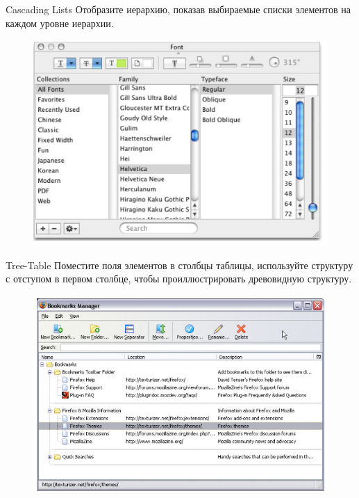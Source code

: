 \documentclass{beamer}
\begin{document}
\begin{frame}[t]{Cascading Lists}
	Отобразите иерархию, показав выбираемые списки элементов на каждом уровне иерархии.
	\begin{figure}[h]
		\centering
		\includegraphics[scale=0.5]{images/lec07-pic65.png}
	\end{figure}
\end{frame}	

\begin{frame}[t]{Tree-Table}
	Поместите поля элементов в столбцы таблицы, используйте структуру с отступом в первом столбце, чтобы проиллюстрировать древовидную структуру.
	\begin{figure}[h]
		\centering
		\includegraphics[scale=0.5]{images/lec07-pic66.png}
	\end{figure}
\end{frame}	

\end{document}
